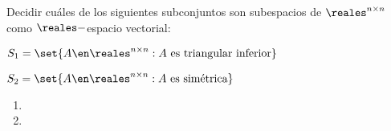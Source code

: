 \begin{enunciado}{\ejercicio}
  Decidir cuáles de los siguientes subconjuntos son subespacios de $\reales^{n \times n}$ como $\reales-$espacio
  vectorial:
  \begin{enumerate}[label=(\alph*)]
    \begin{multicols}{2}
      \item $S_1 = \set{A \en \reales^{n \times n} : A \text{ es triangular inferior}}$
      \item $S_2 = \set{A \en \reales^{n \times n} : A \text{ es simétrica}}$
    \end{multicols}
  \end{enumerate}
\end{enunciado}

  \begin{enumerate}[label=(\alph*)]
      \item \hacer
      \item \hacer
  \end{enumerate}

